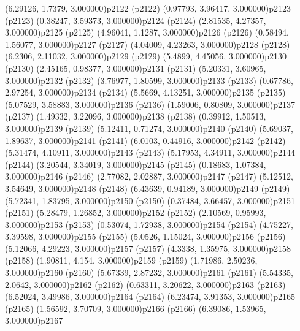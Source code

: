 \psPoint(6.29126, 1.7379, 3.000000){p2122}
\psdot(p2122)
\psPoint(0.97793, 3.96417, 3.000000){p2123}
\psdot(p2123)
\psPoint(0.38247, 3.59373, 3.000000){p2124}
\psdot(p2124)
\psPoint(2.81535, 4.27357, 3.000000){p2125}
\psdot(p2125)
\psPoint(4.96041, 1.1287, 3.000000){p2126}
\psdot(p2126)
\psPoint(0.58494, 1.56077, 3.000000){p2127}
\psdot(p2127)
\psPoint(4.04009, 4.23263, 3.000000){p2128}
\psdot(p2128)
\psPoint(6.2306, 2.11032, 3.000000){p2129}
\psdot(p2129)
\psPoint(5.4899, 4.45056, 3.000000){p2130}
\psdot(p2130)
\psPoint(2.45165, 0.98377, 3.000000){p2131}
\psdot(p2131)
\psPoint(5.20331, 3.60965, 3.000000){p2132}
\psdot(p2132)
\psPoint(3.76977, 1.80599, 3.000000){p2133}
\psdot(p2133)
\psPoint(0.67786, 2.97254, 3.000000){p2134}
\psdot(p2134)
\psPoint(5.5669, 4.13251, 3.000000){p2135}
\psdot(p2135)
\psPoint(5.07529, 3.58883, 3.000000){p2136}
\psdot(p2136)
\psPoint(1.59006, 0.80809, 3.000000){p2137}
\psdot(p2137)
\psPoint(1.49332, 3.22096, 3.000000){p2138}
\psdot(p2138)
\psPoint(0.39912, 1.50513, 3.000000){p2139}
\psdot(p2139)
\psPoint(5.12411, 0.71274, 3.000000){p2140}
\psdot(p2140)
\psPoint(5.69037, 1.89637, 3.000000){p2141}
\psdot(p2141)
\psPoint(6.0103, 0.44916, 3.000000){p2142}
\psdot(p2142)
\psPoint(5.31474, 4.10911, 3.000000){p2143}
\psdot(p2143)
\psPoint(5.17953, 4.34911, 3.000000){p2144}
\psdot(p2144)
\psPoint(3.20544, 3.34019, 3.000000){p2145}
\psdot(p2145)
\psPoint(0.18683, 1.07384, 3.000000){p2146}
\psdot(p2146)
\psPoint(2.77082, 2.02887, 3.000000){p2147}
\psdot(p2147)
\psPoint(5.12512, 3.54649, 3.000000){p2148}
\psdot(p2148)
\psPoint(6.43639, 0.94189, 3.000000){p2149}
\psdot(p2149)
\psPoint(5.72341, 1.83795, 3.000000){p2150}
\psdot(p2150)
\psPoint(0.37484, 3.66457, 3.000000){p2151}
\psdot(p2151)
\psPoint(5.28479, 1.26852, 3.000000){p2152}
\psdot(p2152)
\psPoint(2.10569, 0.95993, 3.000000){p2153}
\psdot(p2153)
\psPoint(0.53074, 1.72938, 3.000000){p2154}
\psdot(p2154)
\psPoint(4.75227, 3.39598, 3.000000){p2155}
\psdot(p2155)
\psPoint(5.0526, 1.15024, 3.000000){p2156}
\psdot(p2156)
\psPoint(5.12066, 4.29223, 3.000000){p2157}
\psdot(p2157)
\psPoint(4.3338, 1.35975, 3.000000){p2158}
\psdot(p2158)
\psPoint(1.90811, 4.154, 3.000000){p2159}
\psdot(p2159)
\psPoint(1.71986, 2.50236, 3.000000){p2160}
\psdot(p2160)
\psPoint(5.67339, 2.87232, 3.000000){p2161}
\psdot(p2161)
\psPoint(5.54335, 2.0642, 3.000000){p2162}
\psdot(p2162)
\psPoint(0.63311, 3.20622, 3.000000){p2163}
\psdot(p2163)
\psPoint(6.52024, 3.49986, 3.000000){p2164}
\psdot(p2164)
\psPoint(6.23474, 3.91353, 3.000000){p2165}
\psdot(p2165)
\psPoint(1.56592, 3.70709, 3.000000){p2166}
\psdot(p2166)
\psPoint(6.39086, 1.53965, 3.000000){p2167}
